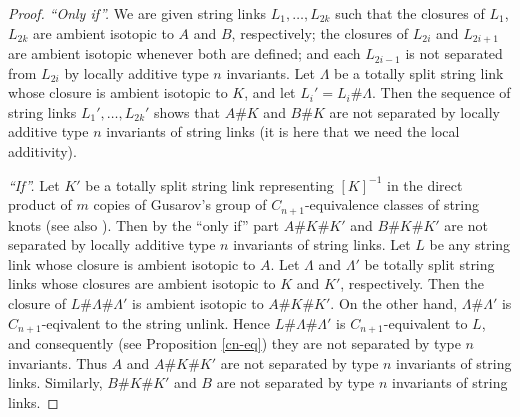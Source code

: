 \documentclass[a4paper,12pt,reqno,oneside]{amsart} %
\theoremstyle{plain}
\theoremstyle{definition}
\theoremstyle{named}
\renewcommand{\:}{\colon}
\begin{document}
\begin{proof} {\it ``Only if''.}
We are given string links $L_1,\dots,L_{2k}$ such that the closures of $L_1$, $L_{2k}$ are ambient isotopic to $A$ and $B$, respectively;
the closures of $L_{2i}$ and $L_{2i+1}$ are ambient isotopic whenever both are defined; and each $L_{2i-1}$ is not separated from $L_{2i}$ 
by locally additive type $n$ invariants.
Let $\Lambda$ be a totally split string link whose closure is ambient isotopic to $K$, and let $L_i'=L_i\#\Lambda$.
Then the sequence of string links $L_1',\dots,L_{2k}'$ shows that $A\#K$ and $B\#K$ are not separated by locally additive type $n$ 
invariants of string links (it is here that we need the local additivity).

{\it ``If''.} Let $K'$ be a totally split string link representing $[K]^{-1}$ in the direct product of $m$ copies of Gusarov's group 
of $C_{n+1}$-equivalence classes of string knots \cite{Gu1} (see also \cite{Hab}).
Then by the ``only if'' part $A\#K\#K'$ and $B\#K\#K'$ are not separated by locally additive type $n$ invariants of string links.
Let $L$ be any string link whose closure is ambient isotopic to $A$.
Let $\Lambda$ and $\Lambda'$ be totally split string links whose closures are ambient isotopic to $K$ and $K'$, respectively.
Then the closure of $L\#\Lambda\#\Lambda'$ is ambient isotopic to $A\#K\#K'$.
On the other hand, $\Lambda\#\Lambda'$ is $C_{n+1}$-eqivalent to the string unlink.
Hence $L\#\Lambda\#\Lambda'$ is $C_{n+1}$-equivalent to $L$, and consequently (see Proposition \ref{cn-eq})
they are not separated by type $n$ invariants.
Thus $A$ and $A\#K\#K'$ are not separated by type $n$ invariants of string links.
Similarly, $B\#K\#K'$ and $B$ are not separated by type $n$ invariants of string links.
\end{proof}
\end{document}
